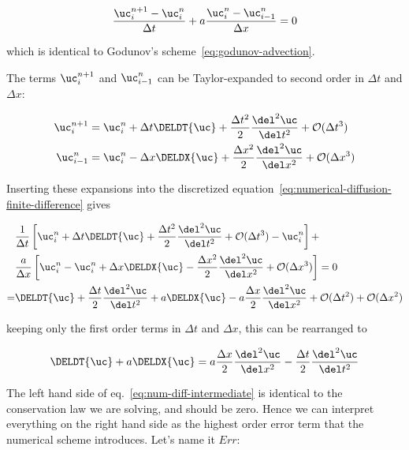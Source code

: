 \begin{align}
    \frac{\uc_i^{n+1} - \uc_i^n}{\Delta t} + a\frac{\uc^{n}_{i} - \uc_{i-1}^n}{\Delta x} = 0
    \label{eq:numerical-diffusion-finite-difference}
\end{align}

which is identical to Godunov's scheme~\ref{eq:godunov-advection}.

The terms $\uc_i^{n+1}$ and $\uc_{i-1}^n$ can be Taylor-expanded to second order in $\Delta t$ and
$\Delta x$:

\begin{align}
    \uc_i^{n+1} &=
        \uc_i^n + \Delta t \DELDT{\uc} +
        \frac{\Delta t^2}{2} \frac{\del^2 \uc}{\del t^2} + \mathcal{O}(\Delta t^3)
    \label{eq:taylor-un+1}\\
    \uc_{i-1}^{n} &=
        \uc_i^n - \Delta x \DELDX{\uc} +
        \frac{\Delta x^2}{2} \frac{\del^2 \uc}{\del x^2} + \mathcal{O}(\Delta x^3)
    \label{eq:taylor-ui-1}
\end{align}


Inserting these expansions into the discretized
equation~\ref{eq:numerical-diffusion-finite-difference} gives

\begin{align}
   & \frac{1}{\Delta t} \left[
        \uc_i^n + \Delta t \DELDT{\uc} +
        \frac{\Delta t^2}{2} \frac{\del^2 \uc}{\del t^2} + \mathcal{O}(\Delta t^3) - \uc_i^n
   \right] + \nonumber \\
   & \frac{a}{\Delta x} \left[
        \uc_i^n - \uc_i^n + \Delta x \DELDX{\uc} -
        \frac{\Delta x^2}{2} \frac{\del^2 \uc}{\del x^2} + \mathcal{O}(\Delta x^3)
   \right] = 0 \\
   = & \DELDT{\uc} + \frac{\Delta t}{2} \frac{\del^2 \uc}{\del t^2}
   + a \DELDX{\uc} - a \frac{\Delta x}{2} \frac{\del^2 \uc}{\del x^2}
    + \mathcal{O}(\Delta t^2) + \mathcal{O}(\Delta x^2)
\end{align}

keeping only the first order terms in $\Delta t$ and $\Delta x$, this can be rearranged to

\begin{align}
   \DELDT{\uc} + a \DELDX{\uc} =
   a \frac{\Delta x}{2} \frac{\del^2 \uc}{\del x^2}
   - \frac{\Delta t}{2} \frac{\del^2 \uc}{\del t^2} \label{eq:num-diff-intermediate}
\end{align}

The left hand side of eq.~\ref{eq:num-diff-intermediate} is identical to the conservation law we
are solving, and should be zero. Hence we can interpret everything on the right hand side as the
highest order error term that the numerical scheme introduces. Let's name it $Err$:

